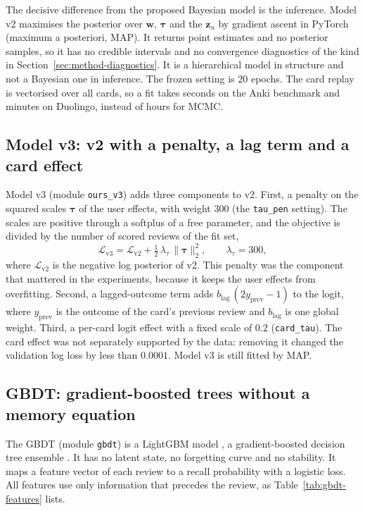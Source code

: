 The decisive difference from the proposed Bayesian model is the inference. Model v2 maximises the posterior
over $\mathbf{w}$, $\boldsymbol{\tau}$ and the $\mathbf{z}_u$ by gradient ascent in PyTorch (maximum a posteriori, MAP).
It returns point estimates and no posterior samples, so it has no credible intervals and no convergence
diagnostics of the kind in Section~\ref{sec:method-diagnostics}. It is a hierarchical model in structure
and not a Bayesian one in inference. The frozen setting is $20$ epochs. The card replay is vectorised over
all cards, so a fit takes seconds on the Anki benchmark and minutes on Duolingo, instead of hours for MCMC.

\subsection{Model v3: v2 with a penalty, a lag term and a card effect}
\label{sec:method-v3}

Model v3 (module \texttt{ours\_v3}) adds three components to v2. First, a penalty on the squared scales
$\boldsymbol{\tau}$ of the user effects, with weight $300$ (the \texttt{tau\_pen} setting). The scales are positive through a softplus of a free parameter, and the objective is divided by the number of scored reviews of the fit set,
\begin{equation}
  \mathcal{L}_{\mathrm{v3}} = \mathcal{L}_{\mathrm{v2}} + \tfrac{1}{2}\,\lambda_{\tau}\,\lVert \boldsymbol{\tau} \rVert_2^2,
  \qquad \lambda_{\tau} = 300,
  \label{eq:v3-penalty}
\end{equation}
where $\mathcal{L}_{\mathrm{v2}}$ is the negative log posterior of v2. This penalty was the component that
mattered in the experiments, because it keeps the user effects from overfitting. Second, a lagged-outcome
term adds $b_{\mathrm{lag}}\,(2 y_{\mathrm{prev}} - 1)$ to the logit, where $y_{\mathrm{prev}}$ is the outcome of the card's
previous review and $b_{\mathrm{lag}}$ is one global weight. Third, a per-card logit effect with a fixed scale of $0.2$
(\texttt{card\_tau}). The card effect was not separately supported by the data: removing it changed the
validation log loss by less than $0.0001$. Model v3 is still fitted by MAP.

\subsection{GBDT: gradient-boosted trees without a memory equation}
\label{sec:method-gbdt}

The GBDT (module \texttt{gbdt}) is a LightGBM model \cite{ke2017lightgbm}, a gradient-boosted
decision tree ensemble \cite{friedman2001greedy}. It has no latent state, no forgetting curve and no
stability. It maps a feature vector of each review to a recall probability with a logistic loss. All
features use only information that precedes the review, as Table~\ref{tab:gbdt-features} lists.


